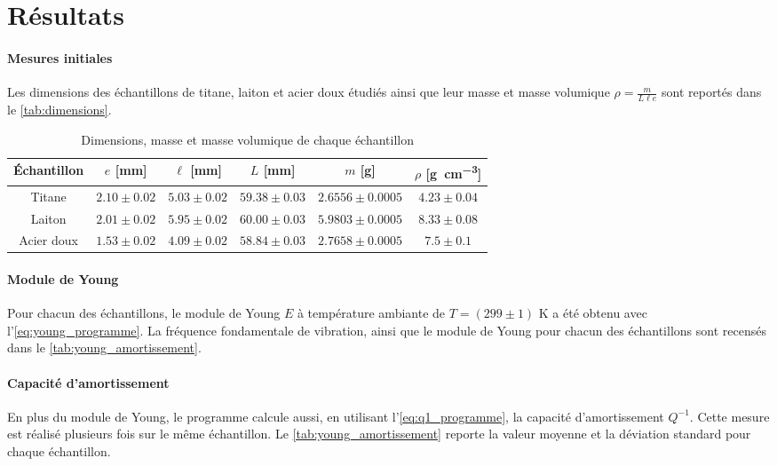 \section{Résultats}

\paragraph{Mesures initiales} Les dimensions des échantillons de titane, laiton et acier doux étudiés ainsi que leur masse et masse volumique \(\rho = \frac{m}{L \ell e}\) sont reportés dans le \autoref{tab:dimensions}.

\begin{table}[h]
    \centering
    \begin{tabulary}{0.7\linewidth}{c|c c c c c}
        \toprule
        Échantillon & \(e\) [\si{\milli\meter}] & \(\ell\) [\si{\milli\meter}] & \(L\) [\si{\milli\meter}] & \(m\) [\si{\gram}] & \(\rho\) [\si{\gram\per\cubic\centi\meter}] \\
        \midrule
        Titane & \(2.10 \pm 0.02\) & \(5.03 \pm 0.02\) & \(59.38 \pm 0.03\) & \(2.6556 \pm 0.0005\) & \(4.23 \pm 0.04\) \\
        Laiton & \(2.01 \pm 0.02\) & \(5.95 \pm 0.02\) & \(60.00 \pm 0.03\) & \(5.9803 \pm 0.0005\) & \(8.33 \pm 0.08\) \\
        Acier doux & \(1.53 \pm 0.02\) & \(4.09 \pm 0.02\) & \(58.84 \pm 0.03\) & \(2.7658 \pm 0.0005\) & \(7.5 \pm 0.1\) \\
        \bottomrule
    \end{tabulary}
    \caption{Dimensions, masse et masse volumique de chaque échantillon}
    \label{tab:dimensions}
\end{table}

\paragraph{Module de Young} Pour chacun des échantillons, le module de Young \(E\) à température ambiante de \(T = (299 \pm 1)\) \si{\kelvin} a été obtenu avec l'\autoref{eq:young_programme}. La fréquence fondamentale de vibration, ainsi que le module de Young pour chacun des échantillons sont recensés dans le \autoref{tab:young_amortissement}.

\paragraph{Capacité d'amortissement} En plus du module de Young, le programme calcule aussi, en utilisant l'\autoref{eq:q1_programme}, la capacité d'amortissement \(Q^{-1}\). Cette mesure est réalisé plusieurs fois sur le même échantillon. Le \autoref{tab:young_amortissement} reporte la valeur moyenne et la déviation standard pour chaque échantillon.

